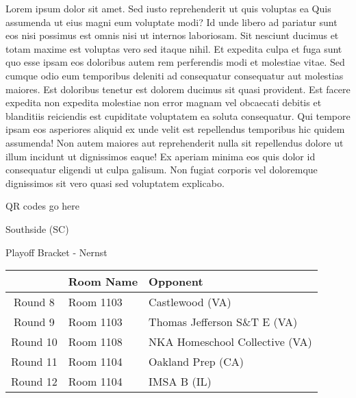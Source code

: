 \documentclass{article}%
\begin{document}
\vspace*{8pt}%
\linebreak%
\newline%
\newline%
Lorem ipsum dolor sit amet. Sed iusto reprehenderit ut quis voluptas ea Quis assumenda ut eius magni eum voluptate modi? Id unde libero ad pariatur sunt eos nisi possimus est omnis nisi ut internos laboriosam. Sit nesciunt ducimus et totam maxime est voluptas vero sed itaque nihil. Et expedita culpa et fuga sunt quo esse ipsam eos doloribus autem rem perferendis modi et molestiae vitae.\newline%
\newline%
Sed cumque odio eum temporibus deleniti ad consequatur consequatur aut molestias maiores. Est doloribus tenetur est dolorem ducimus sit quasi provident. Est facere expedita non expedita molestiae non error magnam vel obcaecati debitis et blanditiis reiciendis est cupiditate voluptatem ea soluta consequatur. Qui tempore ipsam eos asperiores aliquid ex unde velit est repellendus temporibus hic quidem assumenda!\newline%
\newline%
Non autem maiores aut reprehenderit nulla sit repellendus dolore ut illum incidunt ut dignissimos eaque! Ex aperiam minima eos quis dolor id consequatur eligendi ut culpa galisum. Non fugiat corporis vel doloremque dignissimos sit vero quasi sed voluptatem explicabo.\newline%
\newline%
%
\vspace*{30pt}%
\begin{center}%
\begin{Huge}%
QR codes go here%
\end{Huge}%
\end{center}%
\newpage%
\begin{center}%
\begin{Huge}%
Southside (SC)%
\end{Huge}%
\vspace*{8pt}%
\linebreak%
\begin{Large}%
Playoff Bracket {-} Nernst%
\end{Large}%
\end{center}%
%
\begin{tabularx}{\textwidth}{|c|Y|Y|}%
\hline%
&Room Name&Opponent\\%
\hline%
Round 8&Room 1103&Castlewood (VA)\\%
Round 9&Room 1103&Thomas Jefferson S\&T E (VA)\\%
Round 10&Room 1108&NKA Homeschool Collective (VA)\\%
Round 11&Room 1104&Oakland Prep (CA)\\%
Round 12&Room 1104&IMSA B (IL)\\%
\hline%
\end{tabularx}%
\end{document}
